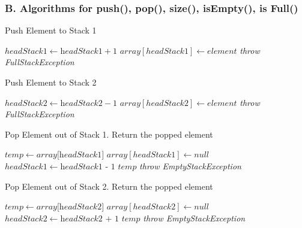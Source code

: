 \documentclass[16pt, letterpaper]{article}
\begin{document}
\subsubsection*{B. Algorithms for push(), pop(), size(), isEmpty(), is Full()}
\begin{algorithm} [H]
\caption{Push Element to Stack 1}
\begin{algorithmic}[1]
	 {}
		\State$headStack1 \gets \textit{headStack1} + 1$
		\State$array[headStack1] \gets \textit{element}$
	\Else
		\State\textit{throw FullStackException}
	\EndIf
	\EndProcedure
\end{algorithmic}
\end{algorithm}

\begin{algorithm} [H]
\caption{Push Element to Stack 2}
\begin{algorithmic}[1]
     {}
        \State $headStack2 \gets \textit{headStack2} - 1$
        \State $array[headStack2] \gets \textit{element}$
    \Else 
        \State\textit{throw FullStackException}
    \EndIf
    \EndProcedure
\end{algorithmic}
\end{algorithm}

\begin{algorithm} [H]
\caption{Pop Element out of Stack 1. Return the popped element}
\begin{algorithmic}[1]
        \State $temp \gets \textit{array[headStack1]}$
        \State $array[headStack1] \gets \textit{null}$
        \State $headStack1 \gets \textit{headStack1 - 1}$ 
        \State \Return $temp$
    \Else
        \State \textit{throw EmptyStackException}
    \EndIf
    \EndProcedure
\end{algorithmic}
\end{algorithm}

\begin{algorithm} [H]
\caption{Pop Element out of Stack 2. Return the popped element}
\begin{algorithmic}[1]
        \State $temp \gets \textit{array[headStack2]}$
        \State $array[headStack2] \gets \textit{null}$
        \State $headStack2 \gets \textit{headStack2 + 1}$
        \State \Return $temp$
    \Else
        \State \textit{throw EmptyStackException}
    \EndIf
    \EndProcedure
\end{algorithmic}
\end{algorithm}
\end{document}
